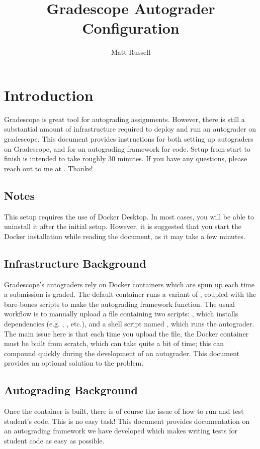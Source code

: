 \documentclass[11pt]{report}
\author{Matt Russell}
\title{Gradescope Autograder Configuration}
\begin{document}
\maketitle

\chapter*{Introduction}
Gradescope is great tool for autograding assignments. However, there is still a substantial amount
of infrastructure required to deploy and run an autograder on gradescope. This document provides 
instructions for both setting up autograders on Gradescope, and for an autograding framework for
 code. Setup from start to finish is intended to take roughly 30 minutes. If you have 
any questions, please reach out to me at . Thanks!

\section*{Notes}
This setup requires the use of Docker Desktop. In most cases, you will be able to uninstall it after 
the initial setup. However, it is suggested that you start the Docker installation while reading the 
document, as it may take a few minutes. 

\section*{Infrastructure Background}
Gradescope's autograders rely on Docker containers which are spun up each time 
a submission is graded. The default container runs a variant of ,
coupled with the bare-bones scripts to make the autograding framework function. The usual 
workflow is to manually upload a  file containing two scripts: 
, which installs dependencies (e.g. , , etc.), and a shell script 
named , which runs the autograder. The main issue here is that each time you 
upload the  file, the Docker container must be built from scratch, which can take quite
a bit of time; this can compound quickly during the development of an autograder. This document 
provides an optional solution to the problem. 

\section*{Autograding Background}
Once the container is built, there is of course the issue of how to run and test student's code. 
This is no easy task! This document provides documentation on an autograding framework we have 
developed which makes writing tests for student code as easy as possible. 
\end{document}
